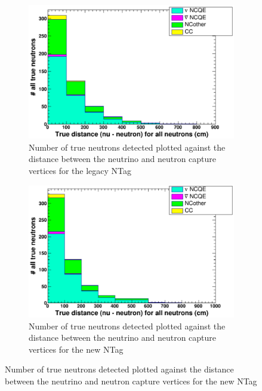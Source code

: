 \begin{figure}
    \centering
     \begin{subfigure}[b]{0.49\linewidth}
      \includegraphics[width=\linewidth]{Figures/TruCapNuNDistanceReductionLegacy.png}
      \caption{Number of true neutrons detected plotted against the distance between the neutrino and neutron capture vertices for the legacy NTag}
      \label{fig:TruCapNuNDistanceReductionLegacy} 
     \end{subfigure}
     \begin{subfigure}[b]{0.49\linewidth}
       \includegraphics[width=\linewidth]{Figures/TruCapNuNDistanceReductionNew.png}
        \caption{Number of true neutrons detected plotted against the distance between the neutrino and neutron capture vertices for the new NTag } 
     \label{fig:TruCapNuNDistanceReductionNew}
      \end{subfigure} 
\end{figure}

